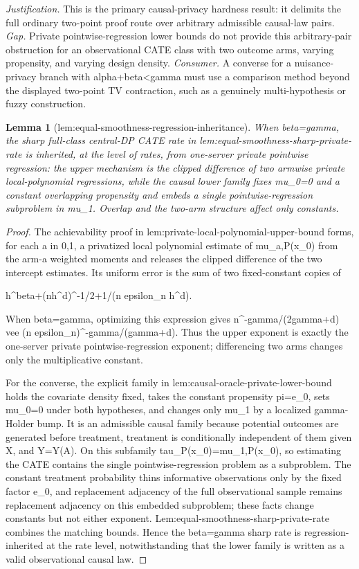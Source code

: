 \documentclass{article}
\newtheorem{lemma}{Lemma}
\begin{document}
\par\smallskip\noindent \textit{Justification.} This is the primary causal-privacy hardness result: it delimits the full ordinary two-point proof route over arbitrary admissible causal-law pairs. \textit{Gap.} Private pointwise-regression lower bounds do not provide this arbitrary-pair obstruction for an observational CATE class with two outcome arms, varying propensity, and varying design density. \textit{Consumer.} A converse for a nuisance-privacy branch with alpha+beta<gamma must use a comparison method beyond the displayed two-point TV contraction, such as a genuinely multi-hypothesis or fuzzy construction.

\begin{lemma}[lem:equal-smoothness-regression-inheritance]\label{lem:equal-smoothness-regression-inheritance}
When beta=gamma, the sharp full-class central-DP CATE rate in lem:equal-smoothness-sharp-private-rate is inherited, at the level of rates, from one-server private pointwise regression: the upper mechanism is the clipped difference of two armwise private local-polynomial regressions, while the causal lower family fixes mu_0=0 and a constant overlapping propensity and embeds a single pointwise-regression subproblem in mu_1. Overlap and the two-arm structure affect only constants.
\end{lemma}
\begin{proof}
The achievability proof in lem:private-local-polynomial-upper-bound forms, for each a in {0,1}, a privatized local polynomial estimate of mu_{a,P}(x_0) from the arm-a weighted moments and releases the clipped difference of the two intercept estimates. Its uniform error is the sum of two fixed-constant copies of

 h^beta+(nh^d)^{-1/2}+1/(n epsilon_n h^d).

When beta=gamma, optimizing this expression gives n^{-gamma/(2gamma+d)} vee (n epsilon_n)^{-gamma/(gamma+d)}. Thus the upper exponent is exactly the one-server private pointwise-regression exponent; differencing two arms changes only the multiplicative constant.

For the converse, the explicit family in lem:causal-oracle-private-lower-bound holds the covariate density fixed, takes the constant propensity pi=e_0, sets mu_0=0 under both hypotheses, and changes only mu_1 by a localized gamma-Holder bump. It is an admissible causal family because potential outcomes are generated before treatment, treatment is conditionally independent of them given X, and Y=Y(A). On this subfamily tau_P(x_0)=mu_{1,P}(x_0), so estimating the CATE contains the single pointwise-regression problem as a subproblem. The constant treatment probability thins informative observations only by the fixed factor e_0, and replacement adjacency of the full observational sample remains replacement adjacency on this embedded subproblem; these facts change constants but not either exponent. Lem:equal-smoothness-sharp-private-rate combines the matching bounds. Hence the beta=gamma sharp rate is regression-inherited at the rate level, notwithstanding that the lower family is written as a valid observational causal law.
\end{proof}
\end{document}
